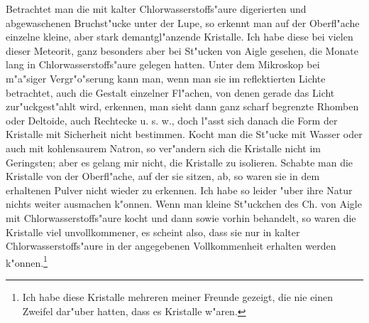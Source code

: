 \documentclass[a4paper, 11pt, oneside]{article}
\begin{document}
Betrachtet man die mit kalter Chlorwasserstoffs"aure digerierten und abgewaschenen Bruchst"ucke unter der Lupe, so erkennt man auf der Oberfl"ache einzelne kleine, aber stark demantgl"anzende Kristalle. Ich habe diese bei vielen dieser Meteorit, ganz besonders aber bei St"ucken von Aigle gesehen, die Monate lang in Chlorwasserstoffs"aure gelegen hatten. Unter dem Mikroskop bei m"a"siger Vergr"o"serung kann man, wenn man sie im reflektierten Lichte betrachtet, auch die Gestalt einzelner Fl"achen, von denen gerade das Licht zur"uckgest"ahlt wird, erkennen, man sieht dann ganz scharf begrenzte Rhomben oder Deltoide, auch Rechtecke u. s. w., doch l"asst sich danach die Form der Kristalle mit Sicherheit nicht bestimmen. Kocht man die St"ucke mit Wasser oder auch mit kohlensaurem Natron, so ver"andern sich die Kristalle nicht im Geringsten; aber es gelang mir nicht, die Kristalle zu isolieren. Schabte man die Kristalle von der Oberfl"ache, auf der sie sitzen, ab, so waren sie in dem erhaltenen Pulver nicht wieder zu erkennen. Ich habe so leider "uber ihre Natur nichts weiter ausmachen k"onnen. Wenn man kleine St"uckchen des Ch. von Aigle mit Chlorwasserstoffs"aure kocht und dann sowie vorhin behandelt, so waren die Kristalle viel unvollkommener, es scheint also, dass sie nur in kalter Chlorwasserstoffs"aure in der angegebenen Vollkommenheit erhalten werden k"onnen.\footnote{Ich habe diese Kristalle mehreren meiner Freunde gezeigt, die nie einen Zweifel dar"uber hatten, dass es Kristalle w"aren.}
\end{document}
